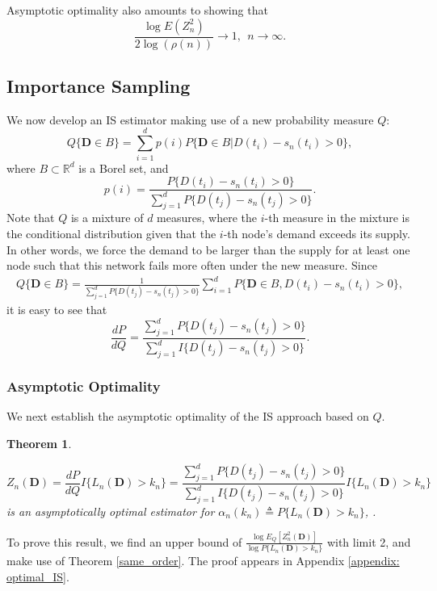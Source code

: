 \documentclass[final,11pt,3p]{article}\usepackage{setspace}
\newtheorem{theorem}{Theorem}
\begin{document}
Asymptotic optimality also amounts to showing that
\[
\frac{\log E(Z_{n}^{2})}{2\log(\rho(n))}\rightarrow1, ~~n \rightarrow\infty.
\]

\subsection{Importance Sampling} \label{sec:IS}

We now develop an IS estimator making use of a new probability measure $Q$:
\begin{equation}
\label{Q_measure}Q\{\boldsymbol{D} \in B\} = \sum_{i=1}^{d} p(i)
P\{\boldsymbol{D} \in B | D(t_{i}) - s_n(t_{i}) > 0\},
\end{equation}
where $B \subset\mathbb{R}^{d}$ is a Borel set, and
\[
p(i) = \frac{P\{D(t_{i}) - s_n(t_{i}) > 0\}}{\sum_{j=1}^{d}P\{D(t_{j}) -
s_n(t_{j}) > 0\}}.
\]
Note that $Q$ is a mixture of $d$ measures, where the $i$-th measure in the
mixture is the conditional distribution given that the $i$-th node's demand
exceeds its supply. In other words, we force the demand to be larger than the supply for at least one node such that this network fails more often under the new measure. Since
\begin{align*}
Q\{\boldsymbol{D} \in B\}   = \frac{1}{\sum_{j=1}^{d}P\{D(t_{j}) - s_n(t_{j}) > 0\}}\sum_{i=1}^{d}
P\{\boldsymbol{D} \in B, D(t_{i}) - s_n(t_{i}) > 0\},
\end{align*}
it is easy to see that
\[
\frac{d P }{d Q } = \frac{\sum_{j=1}^{d}P\{D(t_{j}) - s_n(t_{j}) > 0\}}{\sum_{j=1}^{d} I\{D(t_{j}) - s_n(t_{j}) > 0 \} }.
\]

\subsubsection{Asymptotic Optimality}

We next establish the asymptotic optimality of the IS approach based on $Q$.

\begin{theorem} \label{optimal_IS}

\[
Z_{n}(\boldsymbol{D})= \frac{d P }{d Q }I\{L_{n}(\boldsymbol{D}) > k_n\} =
\frac{\sum_{j=1}^{d}P\{D(t_{j}) - s_n(t_{j}) > 0\}}{\sum_{j=1}^{d} I\{D(t_{j}) -
s_n(t_{j}) > 0 \} }I\{L_{n}(\boldsymbol{D}) > k_n\}
\]
is an asymptotically optimal estimator for $\alpha_{n}(k_n) \triangleq
P\{L_{n}(\boldsymbol{D}) > k_n\}$, {{}}.
\end{theorem}

To prove this result, we find an upper bound of $\frac{ \log E_{{Q}} [Z_n^2(\boldsymbol{D})]}{\log {P} \{L_n(\boldsymbol{D}) > k_n\} }$ with limit 2, and make use of Theorem \ref{same_order}. The proof appears in Appendix \ref{appendix: optimal_IS}.
\end{document}
